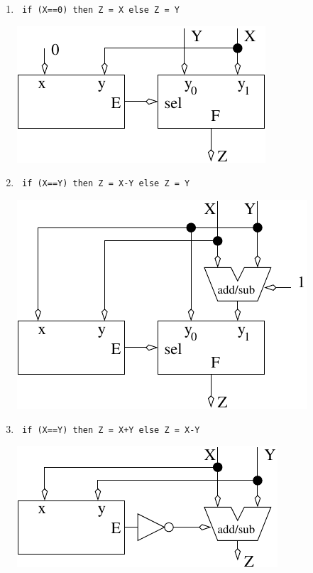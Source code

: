 \begin{enumerate}
\begin{enumerate}
\item \verb^ if (X==0) then Z = X else Z = Y ^

\begin{solution}{
\includegraphics{./FigHw4/Sol4-8d}
} \end{solution}

\item \verb^ if (X==Y) then Z = X-Y else Z = Y ^

\begin{solution}{
\includegraphics{./FigHw4/Sol4-8e}
} \end{solution}

\item \verb^ if (X==Y) then Z = X+Y else Z = X-Y ^

\begin{solution}{
\includegraphics{./FigHw4/Sol4-8f}
} \end{solution}


\end{enumerate}
\end{enumerate}

